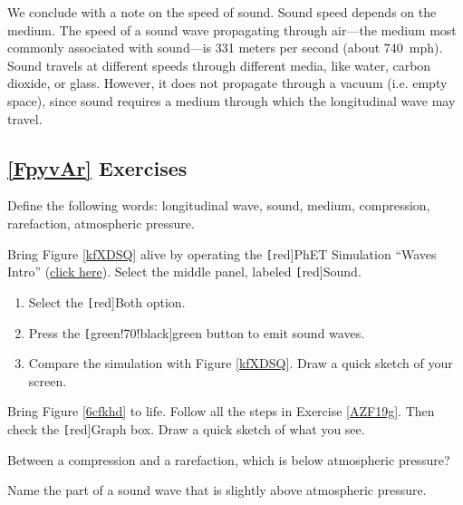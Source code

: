 \documentclass{article}
\numberwithin{equation}{section}
\numberwithin{figure}{section}
\begin{document}
We conclude with a note on the speed of sound. Sound speed depends on the medium. The speed of a sound wave propagating through air---the medium most commonly associated with sound---is 331 meters per second (about \SI{740}{mph}). Sound travels at different speeds through different media, like water, carbon dioxide, or glass. However, it does not propagate through a vacuum (i.e. empty space), since sound requires a medium through which the longitudinal wave may travel.

\subsection*{\ref{FpyvAr} Exercises}

\begin{exercise}
    Define the following words: longitudinal wave, sound, medium, compression, rarefaction, atmospheric pressure. 
\end{exercise}

\begin{exercise} \label{AZF19g}
     Bring Figure \ref{kfXDSQ} alive by operating the \texttt[red]{PhET Simulation} ``Waves Intro'' (\href{https://phet.colorado.edu/sims/html/waves-intro/latest/waves-intro_en.html}{click here}). Select the middle panel, labeled \texttt[red]{Sound}.
    
     \begin{enumerate}
     \setlength\itemsep{0.1ex}
        \item Select the \texttt[red]{Both} option.
        \item Press the \texttt[green!70!black]{green} button to emit sound waves.
        \item Compare the simulation with Figure \ref{kfXDSQ}. Draw a quick sketch of your screen.
     \end{enumerate}
\end{exercise}

\begin{exercise}
    Bring Figure \ref{6cfkhd} to life. Follow all the steps in Exercise \ref{AZF19g}. Then check the \texttt[red]{Graph} box. Draw a quick sketch of what you see. 
\end{exercise}

\begin{exercise}
    Between a compression and a rarefaction, which is below atmospheric pressure?
\end{exercise}

\begin{exercise}
    Name the part of a sound wave that is slightly above atmospheric pressure.
\end{exercise}
\end{document}
